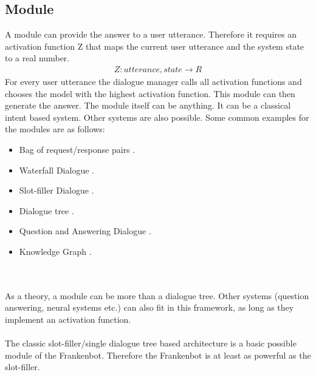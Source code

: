 \subsection{Module}
A module can provide the answer to a user utterance. Therefore it requires an activation function Z that maps the current user utterance and the system state to a real number.
\begin{align*}
 Z: utterance, state \rightarrow R
\end{align*} 
For every user utterance the dialogue manager calls all activation functions and chooses the model with the highest activation function. This module can then generate the answer. The module itself can be anything. It can be a classical intent based system. Other systems are also possible. Some common examples for the modules are as follows:
\begin{itemize}
\item Bag of request/response pairs \cite{rrpairs}.
\item Waterfall Dialogue \cite{waterfallDial}.       
\item Slot-filler Dialogue \cite{slotfillerDial}.
\item Dialogue tree \cite{dialogTree}.
\item Question and Answering Dialogue \cite{q&aDialog}.
\item Knowledge Graph \cite{knowlGraph}.
\end{itemize}
\\~\\
As a theory, a module can be more than a dialogue tree. Other systems (question answering, neural systems etc.) can also fit in this framework, as long as they implement an activation function. 
\\~\\
The classic slot-filler/single dialogue tree based architecture is a basic possible module of the Frankenbot. Therefore the Frankenbot is at least as powerful as the slot-filler.

